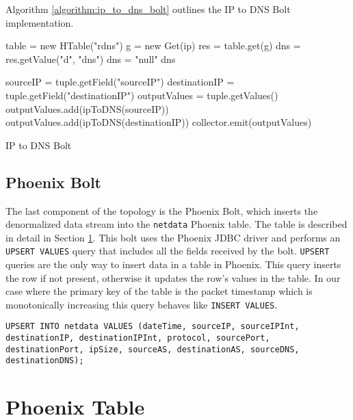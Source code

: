 Algorithm \ref{algorithm:ip_to_dns_bolt} outlines the IP to DNS Bolt implementation. 

\begin{algorithm}[H]
\begin{algorithmic}[1]
\State table = new HTable("rdns")
\State g = new Get(ip)
\State res = table.get(g)
\State dns = res.getValue("d", "dns")
\State dns = "null"
\EndIf
\Return dns
\EndFunction

\State sourceIP = tuple.getField("sourceIP")
\State destinationIP = tuple.getField("destinationIP")
\State outputValues = tuple.getValues()
\State outputValues.add(ipToDNS(sourceIP))
\State outputValues.add(ipToDNS(destinationIP))
\State collector.emit(outputValues)
\EndFunction
\end{algorithmic}
\caption{IP to DNS Bolt}
\label{algorithm:ip_to_dns_bolt}
\end{algorithm}

\subsection{Phoenix Bolt}

The last component of the topology is the Phoenix Bolt, which inserts the denormalized data stream into the \texttt{netdata} Phoenix table. The table is described in detail in Section \ref{section:system_phoenix_table}. This bolt uses the Phoenix JDBC driver and performs an \texttt{UPSERT VALUES} query that includes all the fields received by the bolt. \texttt{UPSERT} queries are the only way to insert data in a table in Phoenix. This query inserts the row if not present, otherwise it updates the row's values in the table. In our case where the primary key of the table is the packet timestamp which is monotonically increasing this query behaves like \texttt{INSERT VALUES}.

\begin{lstlisting}[language=PhoenixSQL]
UPSERT INTO netdata VALUES (dateTime, sourceIP, sourceIPInt, destinationIP, destinationIPInt, protocol, sourcePort, destinationPort, ipSize, sourceAS, destinationAS, sourceDNS, destinationDNS);
\end{lstlisting}


\section{Phoenix Table}\label{section:system_phoenix_table}

